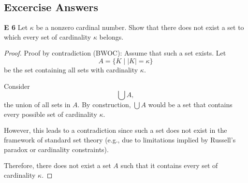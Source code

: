 \subsection{Excercise Answers}
\begin{question}
    \textbf{E 6} Let $\kappa$ be a nonzero cardinal number. Show that there does not exist a set to which every set of cardinality $\kappa$ belongs.
\end{question}
\begin{proof}
    Proof by contradiction (BWOC): Assume that such a set exists. Let 
    \[ 
    A = \{ K \mid |K| = \kappa \} 
    \]
    be the set containing all sets with cardinality $\kappa$.

    Consider 
    \[
    \bigcup A,
    \]
    the union of all sets in $A$. By construction, $\bigcup A$ would be a set that contains every possible set of cardinality $\kappa$.

    However, this leads to a contradiction since such a set does not exist in the framework of standard set theory (e.g., due to limitations implied by Russell's paradox or cardinality constraints).

    Therefore, there does not exist a set $A$ such that it contains every set of cardinality $\kappa$.
\end{proof}

